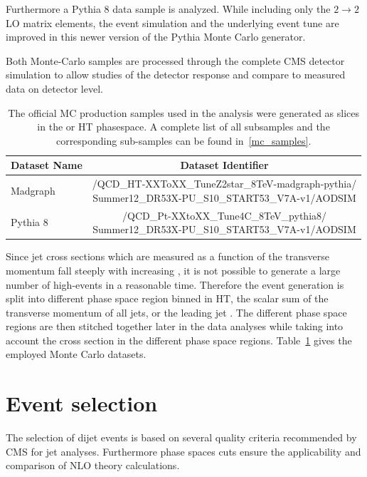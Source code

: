 Furthermore a Pythia 8 data sample is analyzed. While including only the $2
\rightarrow 2$ LO matrix elements, the event simulation and the underlying event
tune are improved in this newer version of the Pythia Monte Carlo generator.

Both Monte-Carlo samples are processed through the complete CMS detector
simulation to allow studies of the detector response and compare to measured
data on detector level. 
\begin{table}[htp]
    \centering
    \caption[Monte Carlo datasets]{The official MC production samples used in
    the analysis were generated as slices in the \pt or HT phasespace. A
    complete list of all subsamples and the corresponding sub-samples can be found
     in~\ref{mc_samples}.}
    \label{tab:montecarlo:datasets}
    \begin{tabular}{lc}
    \toprule
    Dataset Name & Dataset Identifier\\\midrule
    Madgraph & \makecell[l]{/QCD\_HT-XXToXX\_TuneZ2star\_8TeV-madgraph-pythia/\\
        \phantom{aaaa}Summer12\_DR53X-PU\_S10\_START53\_V7A-v1/AODSIM}\\
        Pythia 8 & \makecell[l]{/QCD\_Pt-XXtoXX\_Tune4C\_8TeV\_pythia8/\\
        \phantom{aaaa}Summer12\_DR53X-PU\_S10\_START53\_V7A-v1/AODSIM}\\
    \bottomrule
    \end{tabular}
\end{table}

Since jet cross sections which are measured as a function of the transverse
momentum fall steeply with increasing \pt, it is not possible to generate a
large number of high-\pt events in a reasonable time. Therefore the event
generation is split into different phase space region binned in HT, the scalar
sum of the transverse momentum of all jets, or the leading jet \pt. The
different phase space regions are then stitched together later in the data
analyses while taking into account the cross section in the different phase
space regions.  Table~\ref{tab:montecarlo:datasets} gives the employed Monte
Carlo datasets.

\section{Event selection}
\label{sec:event_selection}

The selection of dijet events is based on several quality criteria recommended by CMS
for jet analyses. Furthermore phase spaces cuts ensure the applicability and
comparison of NLO theory calculations.

